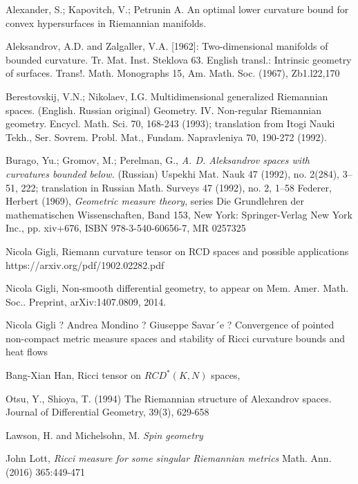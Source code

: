 \documentclass[a4paper,10pt]{article}
\begin{document}
\begin{thebibliography}{52}
 Alexander, S.; Kapovitch, V.; Petrunin A.
An optimal lower curvature bound for convex hypersurfaces in Riemannian manifolds.


Aleksandrov, A.D. and Zalgaller, V.A. [1962]: Two-dimensional manifolds of bounded curvature.
Tr. Mat. Inst. Steklova 63. English transl.: Intrinsic geometry of surfaces. Trans!. Math. Monographs
15, Am. Math. Soc. (1967), Zb1.l22,170


Berestovskij, V.N.; Nikolaev, I.G.
Multidimensional generalized Riemannian spaces. (English. Russian original)
Geometry. IV. Non-regular Riemannian geometry. Encycl. Math. Sci. 70, 168-243 (1993); translation from Itogi Nauki Tekh., Ser. Sovrem. Probl. Mat., Fundam. Napravleniya 70, 190-272 (1992).


 Burago, Yu.; Gromov, M.; Perelman, G., \textit{A. D. Aleksandrov spaces
with curvatures bounded below.} (Russian)  Uspekhi Mat. Nauk  47  (1992),  no.
2(284), 3--51, 222;   translation in  Russian Math. Surveys  47  (1992),  no. 2, 1--58
Federer, Herbert (1969), \textit{Geometric measure theory}, series Die Grundlehren der mathematischen Wissenschaften, Band 153, New York: Springer-Verlag New York Inc., pp. xiv+676, ISBN 978-3-540-60656-7, MR 0257325

Nicola Gigli,
Riemann curvature tensor on RCD spaces and possible applications https://arxiv.org/pdf/1902.02282.pdf

Nicola Gigli,
Non-smooth differential geometry, to appear on Mem. Amer. Math. Soc..
Preprint, arXiv:1407.0809, 2014.

Nicola Gigli ? Andrea Mondino ? Giuseppe Savar´e ?
Convergence of pointed non-compact metric measure spaces
and stability of Ricci curvature bounds and heat flows



 Bang-Xian Han, 
Ricci tensor on $RCD^*(K, N)$ spaces,



   Otsu, Y.,  Shioya, T. (1994)
The Riemannian structure of Alexandrov spaces. Journal of Differential Geometry, 39(3), 629-658

Lawson, H. and Michelsohn, M.
\textit{Spin geometry}

 John Lott,\textit{
Ricci measure for some singular Riemannian metrics}
Math. Ann. (2016) 365:449-471



\end{thebibliography}
\end{document}

